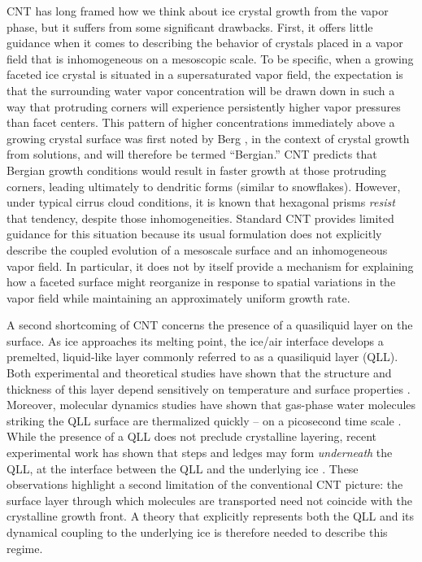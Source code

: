 \documentclass[draft]{agujournal2019}
\begin{document}
CNT has long framed how we think about ice crystal growth from the vapor phase, but it suffers from some significant drawbacks. First, it offers little guidance when it comes to describing the behavior of crystals placed in a vapor field that is inhomogeneous on a mesoscopic scale. To be specific, when a growing faceted ice crystal is situated in a supersaturated vapor field, the expectation is that the surrounding water vapor concentration will be drawn down in such a way that protruding corners will experience persistently higher vapor pressures than facet centers. This pattern of higher concentrations immediately above a growing crystal surface was first noted by Berg \cite{berg_crystal_1938}, in the context of crystal growth from solutions, and will therefore be termed ``Bergian.'' CNT predicts that Bergian growth conditions would result in faster growth at those protruding corners, leading ultimately to dendritic forms (similar to snowflakes). However, under typical cirrus cloud conditions, it is known that hexagonal prisms \textit{resist} that tendency, despite those inhomogeneities. Standard CNT provides limited guidance for this situation because its usual formulation does not explicitly describe the coupled evolution of a mesoscale surface and an inhomogeneous vapor field. In particular, it does not by itself provide a mechanism for explaining how a faceted surface might reorganize in response to spatial variations in the vapor field while maintaining an approximately uniform growth rate.

A second shortcoming of CNT concerns the presence of a quasiliquid layer on the surface. As ice approaches its melting point, the ice/air interface develops a premelted, liquid-like layer commonly referred to as a quasiliquid layer (QLL). Both experimental and theoretical studies have shown that the structure and thickness of this layer depend sensitively on temperature and surface properties \cite{slater_surface_2019,hong_imaging_2024,baran_understanding_2025,macdowell_key_2026}. Moreover, molecular dynamics studies have shown that gas-phase water molecules striking the QLL surface are thermalized quickly -- on a picosecond time scale \cite{neshyba_molecular_2009}. While the presence of a QLL does not preclude crystalline layering, recent experimental work has shown that steps and ledges may form \textit{underneath} the QLL, at the interface between the QLL and the underlying ice \cite{murata_how_2019}. These observations highlight a second limitation of the conventional CNT picture: the surface layer through which molecules are transported need not coincide with the crystalline growth front. A theory that explicitly represents both the QLL and its dynamical coupling to the underlying ice is therefore needed to describe this regime.
\end{document}
